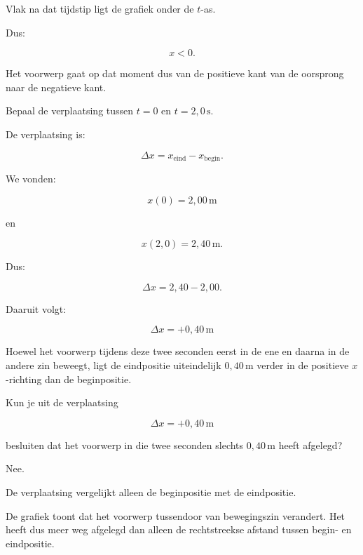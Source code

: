\documentclass{ximera}
\begin{document}
\begin{oefening}{\oefU\ESS}
\begin{question}
\begin{oplossing}
  Vlak na dat tijdstip ligt de grafiek onder de $t$-as.
  
  Dus:
  
  \[
  x<0.
  \]
  
  Het voorwerp gaat op dat moment dus van de positieve kant van de oorsprong
  naar de negatieve kant.
  \end{oplossing}
  \end{question}
  
  
  \begin{question}
  Bepaal de verplaatsing tussen $t=0$ en $t=2{,}0\,\mathrm{s}$.
  
  \begin{oplossing}
  De verplaatsing is:
  
  \[
  \Delta x
  =
  x_{\text{eind}}
  -
  x_{\text{begin}}.
  \]
  
  We vonden:
  
  \[
  x(0)=2{,}00\,\mathrm{m}
  \]
  
  en
  
  \[
  x(2{,}0)=2{,}40\,\mathrm{m}.
  \]
  
  Dus:
  
  \[
  \Delta x
  =
  2{,}40-2{,}00.
  \]
  
  Daaruit volgt:
  
  \[
  \boxed{\Delta x=+0{,}40\,\mathrm{m}}
  \]
  
  Hoewel het voorwerp tijdens deze twee seconden eerst in de ene en daarna in
  de andere zin beweegt, ligt de eindpositie uiteindelijk
  $0{,}40\,\mathrm{m}$ verder in de positieve $x$-richting dan de beginpositie.
  \end{oplossing}
  \end{question}
  
  
  \begin{question}
  Kun je uit de verplaatsing
  
  \[
  \Delta x=+0{,}40\,\mathrm{m}
  \]
  
  besluiten dat het voorwerp in die twee seconden slechts
  $0{,}40\,\mathrm{m}$ heeft afgelegd?
  
  \begin{oplossing}
  Nee.
  
  De verplaatsing vergelijkt alleen de beginpositie met de eindpositie.
  
  De grafiek toont dat het voorwerp tussendoor van bewegingszin verandert.
  Het heeft dus meer weg afgelegd dan alleen de rechtstreekse afstand tussen
  begin- en eindpositie.
  

\end{oplossing}
\end{question}
\end{oefening}
\end{document}
